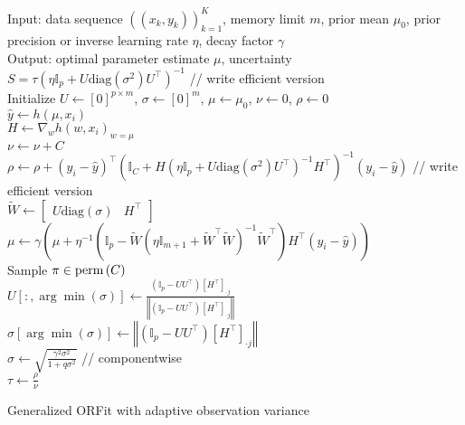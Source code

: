 \begin{algorithm}
\dontprintsemicolon
Input: data sequence $\left(\left(x_{k},y_{k}\right)\right)_{k=1}^{K}$,
memory limit $m$, prior mean $\mu_{0}$, prior precision or inverse learning rate $\eta$,
decay factor $\gamma$ \\
Output: optimal parameter estimate $\mu$, uncertainty
$S=\tau\left(\eta\mathbb{I}_{p}+U\text{diag}(\sigma^2)U^{\top}\right)^{-1}$ // write efficient version\\
Initialize $U\leftarrow\left[0\right]^{p\times m}$, $\sigma\leftarrow\left[0\right]^{m}$,
$\mu\leftarrow\mu_{0}$, $\nu\leftarrow0$, $\rho\leftarrow0$ \\
 {
$\hat{y}\leftarrow h\left(\mu,x_{i}\right)$ \\
$H\leftarrow\nabla_{w}h\left(w,x_{i}\right)_{w=\mu}$ \\
$\nu\leftarrow\nu+C$ \\
$\rho\leftarrow\rho+(y_i-\hat{y})^{\top}(\mathbb{I}_C+H\left(\eta\mathbb{I}_{p}+U\text{diag}(\sigma^2)U^{\top}\right)^{-1}H^{\top})^{-1}(y_i-\hat{y})$ // write efficient version\\
$\tilde{W}\leftarrow\left[\begin{array}{cc}U\text{diag}(\sigma) & H^{\top}\end{array}\right]$ \\
$\mu\leftarrow\gamma\left(\mu+\eta^{-1}\left(\mathbb{I}_{p}-\tilde{W}\left(\eta\mathbb{I}_{m+1}+\tilde{W}^{\top}\tilde{W}\right)^{-1}\tilde{W}^{\top}\right)H^{\top}\left(y_{i}-\hat{y}\right)\right)$ \\
Sample $\pi\in{\rm perm}\left(C\right)$ \\
 { 
 {
$U\left[:,\arg\min\left(\sigma\right)\right]\leftarrow\frac{\left(\mathbb{I}_{p}-UU^{\top}\right)\left[H^{\top}\right]_{\cdot j}}{\left\Vert \left(\mathbb{I}_{p}-UU^{\top}\right)\left[H^{\top}\right]_{\cdot j}\right\Vert }$ \\
$\sigma\left[\arg\min\left(\sigma\right)\right]\leftarrow\left\Vert \left(\mathbb{I}_{p}-UU^{\top}\right)\left[H^{\top}\right]_{\cdot j}\right\Vert $ \\
}
}
$\sigma\leftarrow\sqrt{\frac{\gamma^{2}\sigma^{2}}{1+q\sigma^{2}}}$ // componentwise \\
}
$\tau\leftarrow\frac{\rho}{\nu}$
\caption{\label{alg:ORFit-gamma-hyperprior}Generalized ORFit with adaptive observation variance}
\end{algorithm}

